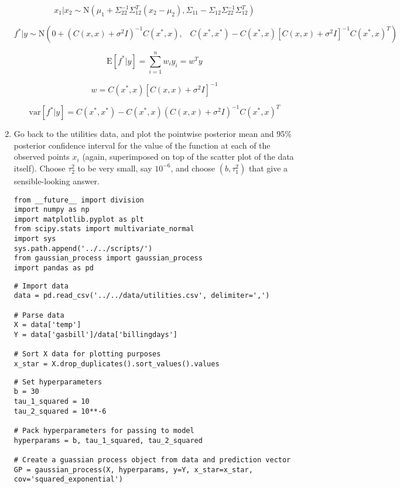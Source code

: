 \documentclass[10pt]{article}
\begin{document}
\begin{enumerate}[label=(\Alph*)]
            $$x_1 | x_2 \sim \text{N}(\mu_1 + \Sigma_{22}^{-1} \Sigma_{12}^T(x_2 - \mu_2), \Sigma_{11} - \Sigma_{12} \Sigma_{22}^{-1}\Sigma_{12}^T)$$

            $$f^* | y \sim \text{N} \left(0 + (C(x,x) + \sigma^2 I)^{-1} C(x^*, x), \hspace{10pt} C(x^*, x^*) - C(x^*, x) [C(x,x) + \sigma^2 I]^{-1} C(x^*, x)^T \right)$$

            $$\text{E}[f^*|y] = \sum_{i=1}^n w_i y_i= w^T y$$

            $$w = C(x^*, x) [C(x, x) + \sigma^2 I]^{-1}$$

            $$\text{var}[f^*| y] = C(x^*, x^*) - C(x^*, x) ( C(x, x) + \sigma^2 I)^{-1} C(x^*, x)^T$$

            \item Go back to the utilities data, and plot the pointwise posterior mean and 95\% posterior confidence interval for the value of the function at each of the observed points $x_i$ (again, superimposed on top of the scatter plot of the data itself).  Choose $\tau^2_2$ to be very small, say $10^{-6}$, and choose $(b, \tau^2_1)$ that give a sensible-looking answer.

        \begin{lstlisting}
from __future__ import division
import numpy as np 
import matplotlib.pyplot as plt
from scipy.stats import multivariate_normal
import sys
sys.path.append('../../scripts/')
from gaussian_process import gaussian_process
import pandas as pd
        \end{lstlisting}

        \begin{lstlisting}
# Import data
data = pd.read_csv('../../data/utilities.csv', delimiter=',')

# Parse data
X = data['temp']
Y = data['gasbill']/data['billingdays']

# Sort X data for plotting purposes
x_star = X.drop_duplicates().sort_values().values
        \end{lstlisting}

        \begin{lstlisting}
# Set hyperparameters
b = 30
tau_1_squared = 10
tau_2_squared = 10**-6

# Pack hyperparameters for passing to model
hyperparams = b, tau_1_squared, tau_2_squared

# Create a guassian process object from data and prediction vector
GP = gaussian_process(X, hyperparams, y=Y, x_star=x_star, cov='squared_exponential')
        \end{lstlisting}


\end{enumerate}
\end{document}
